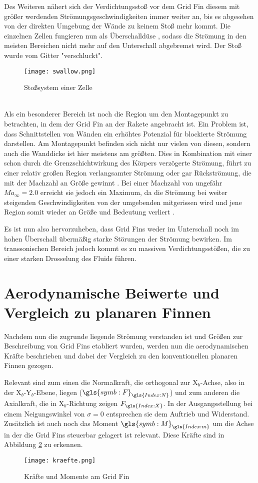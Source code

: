 Des Weiteren nähert sich der Verdichtungsstoß vor dem Grid Fin diesem mit größer werdenden Strömungsgeschwindigkeiten immer weiter an, bis es abgesehen von der direkten Umgebung der Wände zu keinem Stoß mehr kommt. Die einzelnen Zellen fungieren nun als Überschalldüse \cite{stroemung}, sodass die Strömung in den meisten Bereichen nicht mehr auf den Unterschall abgebremst wird. Der Stoß wurde vom Gitter "verschluckt".
\begin{figure}[h]
	\centering
	\texttt{[image: swallow.png]}
	\begin{flushright}
	\end{flushright}
	\caption{Stoßsystem einer Zelle}
	\label{abb_stoesse}
\end{figure}\\
Als ein besonderer Bereich ist noch die Region um den Montagepunkt zu betrachten, in dem der Grid Fin an der Rakete angebracht ist. Ein Problem ist, dass Schnittstellen von Wänden ein erhöhtes Potenzial für blockierte Strömung darstellen. Am Montagepunkt befinden sich nicht nur vielen von diesen, sondern auch die Wanddicke ist hier meistens am größten. Dies in Kombination mit einer schon durch die Grenzschichtwirkung des Körpers verzögerte Strömung, führt zu einer relativ großen Region verlangsamter Strömung oder gar Rückströmung, die mit der Machzahl an Größe gewinnt \cite{stroemung}. Bei einer Machzahl von ungefähr $Ma_\infty = 2.0$ erreicht sie jedoch ein Maximum, da die Strömung bei weiter steigenden Geschwindigkeiten von der umgebenden mitgerissen wird und jene Region somit wieder an Größe und Bedeutung verliert \cite{stroemung}.

Es ist nun also hervorzuheben, dass Grid Fins weder im Unterschall noch im hohen Überschall übermäßig starke Störungen der Strömung bewirken. Im transsonischen Bereich jedoch kommt es zu massiven Verdichtungsstößen, die zu einer starken Drosselung des Fluids führen.


\section{Aerodynamische Beiwerte und Vergleich zu planaren Finnen}
Nachdem nun die zugrunde liegende Strömung verstanden ist und Größen zur Beschreibung von Grid Fins etabliert wurden, werden nun die aerodynamischen Kräfte beschrieben und dabei der Vergleich zu den konventionellen planaren Finnen gezogen.

Relevant sind zum einen die Normalkraft, die orthogonal zur X$_b$-Achse, also in der X$_b$-Y$_b$-Ebene, liegen ($\gls{symb:F}_{\gls{Index:N}}$) und zum anderen die Axialkraft, die in X$_b$-Richtung zeigen $F_{\gls{Index:X}}$. In der Ausgangsstellung bei einem Neigungswinkel von $\sigma = 0$ entsprechen sie dem Auftrieb und Widerstand. Zusätzlich ist auch noch das Moment $\gls{symb:M}_{\gls{Index:m}}$ um die Achse in der die Grid Fins steuerbar gelagert ist relevant. Diese Kräfte sind in Abbildung \ref{abb_kraefte} zu erkennen.
\begin{figure}[h]
	\centering
	\texttt{[image: kraefte.png]}
	\caption{Kräfte und Momente am Grid Fin}
	\label{abb_kraefte}
\end{figure}\\
